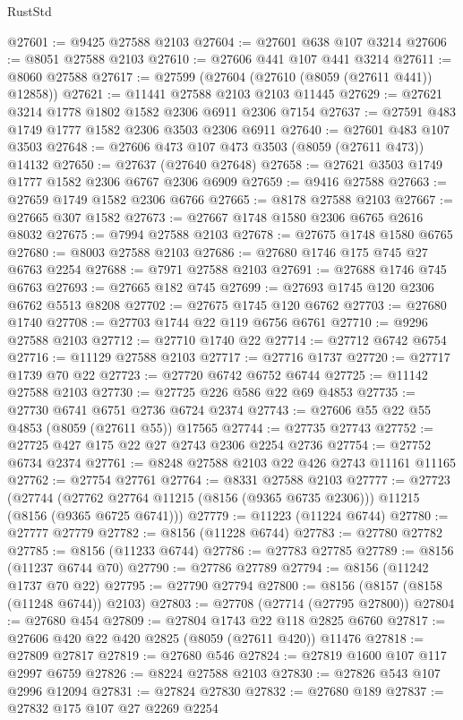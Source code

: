 \begin{lexlean}{RustStd}
\begin{coremodule}
@27601 := @9425 @27588 @2103
@27604 := @27601 @638 @107 @3214
@27606 := @8051 @27588 @2103
@27610 := @27606 @441 @107 @441 @3214
@27611 := @8060 @27588
@27617 := @27599 (@27604 (@27610 (@8059 (@27611 @441)) @12858))
@27621 := @11441 @27588 @2103 @2103 @11445
@27629 := @27621 @3214 @1778 @1802 @1582 @2306 @6911 @2306 @7154
@27637 := @27591 @483 @1749 @1777 @1582 @2306 @3503 @2306 @6911
@27640 := @27601 @483 @107 @3503
@27648 := @27606 @473 @107 @473 @3503 (@8059 (@27611 @473)) @14132
@27650 := @27637 (@27640 @27648)
@27658 := @27621 @3503 @1749 @1777 @1582 @2306 @6767 @2306 @6909
@27659 := @9416 @27588
@27663 := @27659 @1749 @1582 @2306 @6766
@27665 := @8178 @27588 @2103
@27667 := @27665 @307 @1582
@27673 := @27667 @1748 @1580 @2306 @6765 @2616 @8032
@27675 := @7994 @27588 @2103
@27678 := @27675 @1748 @1580 @6765
@27680 := @8003 @27588 @2103
@27686 := @27680 @1746 @175 @745 @27 @6763 @2254
@27688 := @7971 @27588 @2103
@27691 := @27688 @1746 @745 @6763
@27693 := @27665 @182 @745
@27699 := @27693 @1745 @120 @2306 @6762 @5513 @8208
@27702 := @27675 @1745 @120 @6762
@27703 := @27680 @1740
@27708 := @27703 @1744 @22 @119 @6756 @6761
@27710 := @9296 @27588 @2103
@27712 := @27710 @1740 @22
@27714 := @27712 @6742 @6754
@27716 := @11129 @27588 @2103
@27717 := @27716 @1737
@27720 := @27717 @1739 @70 @22
@27723 := @27720 @6742 @6752 @6744
@27725 := @11142 @27588 @2103
@27730 := @27725 @226 @586 @22 @69 @4853
@27735 := @27730 @6741 @6751 @2736 @6724 @2374
@27743 := @27606 @55 @22 @55 @4853 (@8059 (@27611 @55)) @17565
@27744 := @27735 @27743
@27752 := @27725 @427 @175 @22 @27 @2743 @2306 @2254 @2736
@27754 := @27752 @6734 @2374
@27761 := @8248 @27588 @2103 @22 @426 @2743 @11161 @11165
@27762 := @27754 @27761
@27764 := @8331 @27588 @2103
@27777 := @27723
    (@27744 (@27762 @27764 @11215 (@8156 (@9365 @6735 @2306))) @11215 (@8156 (@9365 @6725 @6741)))
@27779 := @11223 (@11224 @6744)
@27780 := @27777 @27779
@27782 := @8156 (@11228 @6744)
@27783 := @27780 @27782
@27785 := @8156 (@11233 @6744)
@27786 := @27783 @27785
@27789 := @8156 (@11237 @6744 @70)
@27790 := @27786 @27789
@27794 := @8156 (@11242 @1737 @70 @22)
@27795 := @27790 @27794
@27800 := @8156 (@8157 (@8158 (@11248 @6744)) @2103)
@27803 := @27708 (@27714 (@27795 @27800))
@27804 := @27680 @454
@27809 := @27804 @1743 @22 @118 @2825 @6760
@27817 := @27606 @420 @22 @420 @2825 (@8059 (@27611 @420)) @11476
@27818 := @27809 @27817
@27819 := @27680 @546
@27824 := @27819 @1600 @107 @117 @2997 @6759
@27826 := @8224 @27588 @2103
@27830 := @27826 @543 @107 @2996 @12094
@27831 := @27824 @27830
@27832 := @27680 @189
@27837 := @27832 @175 @107 @27 @2269 @2254

\end{coremodule}
\end{lexlean}
